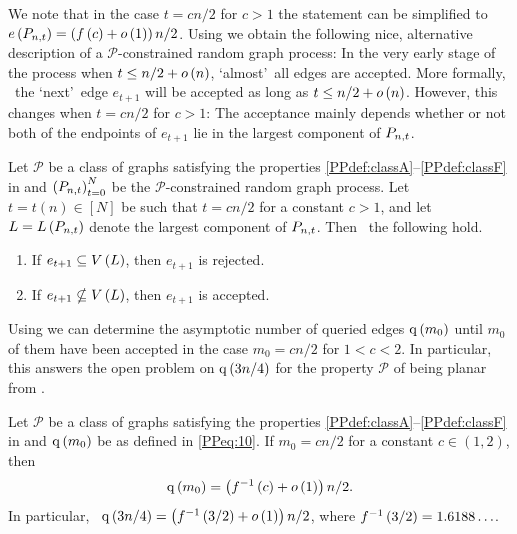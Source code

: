 We note that in the case $t=cn/2$ for $c>1$ the statement can be simplified to \whp\ $e\left({P_{n,t}}\right)=\left(f\left(c\right)+o\left(1\right)\right)n/2$. Using  we obtain the following nice, alternative description of a $\mathcal{P}$-constrained random graph process: In the very early stage of the process when $t\leq n/2+o\left(n\right)$, \lq almost\rq\ all edges are accepted. More formally, \whp\ the \lq next\rq\ edge $e_{t+1}$ will be accepted as long as $t\leq n/2+o\left(n\right)$. However, this changes when $t=cn/2$ for $c>1$: The acceptance mainly depends whether or not both of the endpoints of $e_{t+1}$ lie in the largest component of $P_{n,t}$.

\begin{coro}\label{PPcoro:main}
Let $\mathcal{P}$ be a class of graphs satisfying the properties \ref{PPdef:classA}--\ref{PPdef:classF} in  and $\left(P_{n,t}\right)_{t=0}^{N}$ be the $\mathcal{P}$-constrained random graph process. Let $t=t(n)\in\left[N\right]$ be such that $t=cn/2$ for a constant $c>1$, and let $L=L\left(P_{n,t}\right)$ denote the largest component of $P_{n,t}$. Then \whp\ the following hold.
\begin{enumerate}
\item\label{PPcoro:mainA}
If $e_{t+1}\subseteq V\left(L\right)$, then $e_{t+1}$ is rejected.
\item\label{PPcoro:mainB}
If $e_{t+1}\nsubseteq V\left(L\right)$, then $e_{t+1}$ is accepted.
\end{enumerate}
\end{coro}

Using  we can determine the asymptotic number of queried edges $\operatorname{q}\left(m_0\right)$ until $m_0$ of them have been accepted in the case $m_0=cn/2$ for $1<c<2$. In particular, this answers the open problem on $\operatorname{q}\left(3n/4\right)$ for the property $\mathcal{P}$ of being planar from \cite{GerkeSchlatterStegerTaraz2008}.

\begin{coro}\label{PPcoro:considered}
	Let $\mathcal{P}$ be a class of graphs satisfying the properties \ref{PPdef:classA}--\ref{PPdef:classF} in  and $\operatorname{q}\left(m_0\right)$ be as defined in \eqref{PPeq:10}. If $m_0=cn/2$ for a constant $c\in(1,2)$, then \whp
	\begin{align*}
		\operatorname{q}\left(m_0\right)=\left(f^{-1}\left(c\right)+o\left(1\right)\right)n/2.
	\end{align*}
	In particular, \whp\ $\operatorname{q}\left(3n/4\right)=\left(f^{-1}\left(3/2\right)+o\left(1\right)\right)n/2$, where $f^{-1}\left(3/2\right)=1.6188\ldots$.
\end{coro}

